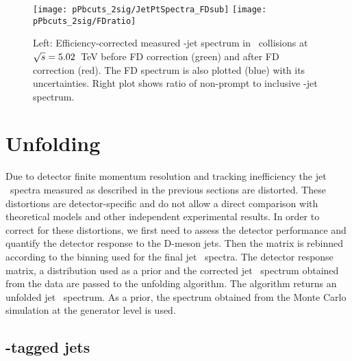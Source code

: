 \begin{figure}[bth]
\centering
\texttt{[image: pPbcuts\_2sig/JetPtSpectra\_FDsub]}
\texttt{[image: pPbcuts\_2sig/FDratio]}
\caption{Left: Efficiency-corrected measured \Dzero-jet spectrum in \pp\ collisions at $\sqrt{s}=5.02$~TeV before FD correction (green) and after FD correction (red). The FD spectrum is also plotted (blue) with its uncertainties. Right plot shows ratio of non-prompt to inclusive \Dzero-jet spectrum.}
\label{fig:pPbFD_corr_Dzero}
\end{figure}



\section{Unfolding}
\label{sect:unfResults}

Due to detector finite momentum resolution and tracking inefficiency the jet \pt\ spectra measured as described
in the previous sections are distorted. These distortions are detector-specific and do not allow a direct comparison
with theoretical models and other independent experimental results.
In order to correct for these distortions, we first need to assess the detector performance and quantify
the detector response to the D-meson jets. 
Then the matrix is rebinned according to the binning used for the final jet \pt\ spectra. The detector response matrix, a distribution used as a prior and the corrected jet \pt\ spectrum obtained from the data are passed to the unfolding algorithm. The algorithm returns an unfolded jet \pt\ spectrum. As a prior, the spectrum obtained from the Monte Carlo simulation at the generator level is used.


\subsection{\Dzero-tagged jets}

